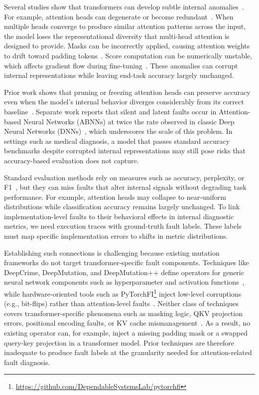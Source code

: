 Several studies show that transformers can develop subtle internal anomalies~\cite{ABNN_sigma,attentionPlease,attentioncollapse,attentioncollapsecompress,miller2023attention}. For example, attention heads can degenerate or become redundant~\citep{michel2019sixteen,voita2019analyzing}. When multiple heads converge to produce similar attention patterns across the input, the model loses the representational diversity that multi-head attention is designed to provide.
Masks can be incorrectly applied, causing attention weights to drift toward padding tokens~\citep{dao2022flashattention,vaswani2017attention}.
Score computation can be numerically unstable, which affects gradient flow during fine-tuning~\citep{xiong2020layer,mosbach2021stability}.
These anomalies can corrupt internal representations while leaving end-task accuracy largely unchanged.

Prior work shows that pruning or freezing attention heads can preserve accuracy even when the model's internal behavior diverges considerably from its correct baseline~\citep{michel2019sixteen}. Separate work reports that silent and latent faults occur in Attention-based Neural Networks (ABNNs) at twice the rate observed in classic Deep Neural Networks (DNNs)~\citep{ABNN_sigma}, which underscores the scale of this problem.
In settings such as medical diagnosis, a model that passes standard accuracy benchmarks despite corrupted internal representations may still pose risks that accuracy-based evaluation does not capture.

Standard evaluation methods rely on measures such as accuracy, perplexity, or F1~\citep{wang2018glue}, but they can miss faults that alter internal signals without degrading task performance. For example, attention heads may collapse to near-uniform distributions while classification accuracy remains largely unchanged.
To link implementation-level faults to their behavioral effects in internal diagnostic metrics, we need execution traces with ground-truth fault labels. These labels must map specific implementation errors to shifts in metric distributions.

Establishing such connections is challenging because existing mutation frameworks do not target transformer-specific fault components. Techniques like DeepCrime, DeepMutation, and DeepMutation++ define operators for generic neural network components such as hyperparameter and activation functions~\citep{deepmetis,deepmutation++,deepcrime,deepmutation}, while hardware-oriented tools such as PyTorchFI\footnote{\url{https://github.com/DependableSystemsLab/pytorchfi}} inject low-level corruptions (e.g., bit-flips) rather than attention-level faults~\citep{pytorchfi}. Neither class of techniques covers transformer-specific phenomena such as masking logic, QKV projection errors, positional encoding faults, or KV cache mismanagement~\citep{ABNN_sigma}. As a result, no existing operator can, for example, inject a missing padding mask or a swapped query-key projection in a transformer model.
Prior techniques are therefore inadequate to produce fault labels at the granularity needed for attention-related fault diagnosis.

